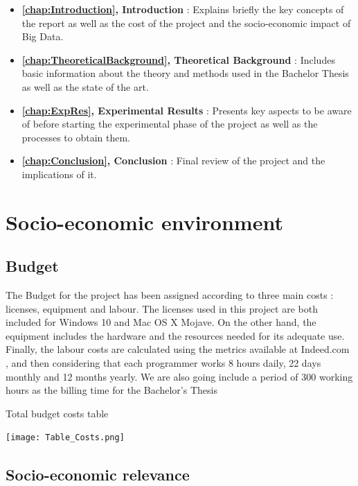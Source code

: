 \begin{itemize}
	\item \textbf{ \autoref{chap:Introduction}, Introduction} : Explains briefly the key concepts of the report as well as the cost of the project and the socio-economic impact of Big Data.
	
	\item \textbf{ \autoref{chap:TheoreticalBackground}, Theoretical Background} : Includes basic information about the theory and methods used in the Bachelor Thesis as well as the state of the art.
	
	\item \textbf{ \autoref{chap:ExpRes}, Experimental Results} : Presents key aspects to be aware of before starting the experimental phase of the project as well as the processes to obtain them.
	
	\item \textbf{ \autoref{chap:Conclusion}, Conclusion} : Final review of the project and the implications of it.
	
\end{itemize}

\section{Socio-economic environment}
\subsection{Budget}

The Budget for the project has been assigned according to three main costs : licenses, equipment and labour. The licenses used in this project are both included for Windows 10 and Mac OS X Mojave. On the other hand, the equipment includes the hardware and the resources needed for its adequate use. Finally, the labour costs are calculated using the metrics available at Indeed.com \cite{ProgrammerSalaries}, and then considering that each programmer works 8 hours daily, 22 days monthly and 12 months yearly. We are also going include a period of 300 working hours as the billing time for the Bachelor's Thesis \par
\begin{table}[H]
	\caption{Total budget costs table}
	\label{tbl:budget_table}
	\texttt{[image: Table\_Costs.png]}
\end{table}

\subsection{Socio-economic relevance}

